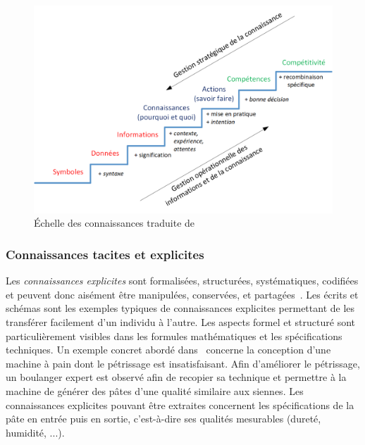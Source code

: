 \begin{figure}[ht]
\centering
\centerline{  %
\includegraphics[scale=0.85]{2-Etat-de-l'Art/images/KM/KnowledgeLadder.png}
}
\caption{\'Echelle des connaissances traduite de~\cite{north2018knowledge}}
\label{figure:2-S1-KnowledgeLadder}
\end{figure}


\subsubsection{Connaissances tacites et explicites}
\label{subsubsection:Contexte:KIP-RevueLitterature:KM:ConnaissancesTacitesExplicites}

Les \textit{connaissances explicites} sont formalisées, structurées, systématiques, codifiées et peuvent donc aisément être manipulées, conservées, et partagées~\cite{north2018knowledge}\cite{syed2018palgrave}\cite{nonaka2007knowledge}\cite{nonaka2000seci}.
Les écrits et schémas sont les exemples typiques de connaissances explicites permettant de les transférer facilement d'un individu à l'autre.
Les aspects formel et structuré sont particulièrement visibles dans les formules mathématiques et les spécifications techniques.
Un exemple concret abordé dans~\cite{nonaka2007knowledge} concerne la conception d'une machine à pain dont le pétrissage est insatisfaisant.
Afin d'améliorer le pétrissage, un boulanger expert est observé afin de recopier sa technique et permettre à la machine de générer des pâtes d'une qualité similaire aux siennes.
Les connaissances explicites pouvant être extraites concernent les spécifications de la pâte en entrée puis en sortie, c'est-à-dire ses qualités mesurables (dureté, humidité, ...).

